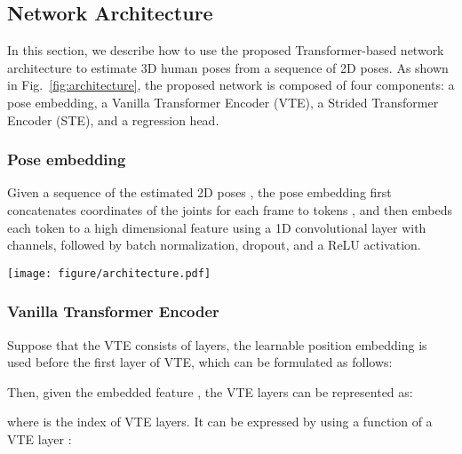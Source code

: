 \documentclass[journal]{IEEEtran}
\begin{document}
\subsection{Network Architecture}
\label{sec:transpose}
In this section, we describe how to use the proposed Transformer-based network architecture to estimate 3D human poses from a sequence of 2D poses. 
As shown in Fig.~\ref{fig:architecture}, the proposed network is composed of four components: a pose embedding, a Vanilla Transformer Encoder (VTE), a Strided Transformer Encoder (STE), and a regression head. 

\subsubsection{Pose embedding}
Given a sequence of the estimated 2D poses , the pose embedding first concatenates  coordinates of the  joints for each frame to tokens , and then embeds each token to a high dimensional feature  using a 1D convolutional layer with  channels, followed by batch normalization, dropout, and a ReLU activation. 

\begin{figure*}[t]
   \centering
   \texttt{[image: figure/architecture.pdf]}
   \caption
   {
      An instantiation of the proposed Strided Transformer network.  
      It reconstructs the target 3D body joints by progressively reducing the sequence length. 
      The input consists of 2D keypoints for a receptive field of 27 frames with  joints. 
      Convolutional feed-forward networks are in blue where  denotes kernels of size 3 with strided factor 3 and 256 output channels. 
      The tensor sizes are shown in parentheses, \emph{e.g.},  denotes 27 frames and 34 channels. 
      Due to strided convolutions, the max pooling operation is applied to the residuals to match the shape of subsequent tensors.
   }
   \label{fig:architecture}
\end{figure*}

\subsubsection{Vanilla Transformer Encoder}
Suppose that the VTE consists of  layers, the learnable position embedding  is used before the first layer of VTE, which can be formulated as follows: 


Then, given the embedded feature , the VTE layers can be represented as: 

where  is the index of VTE layers. 
It can be expressed by using a function of a VTE layer : 
\end{document}
